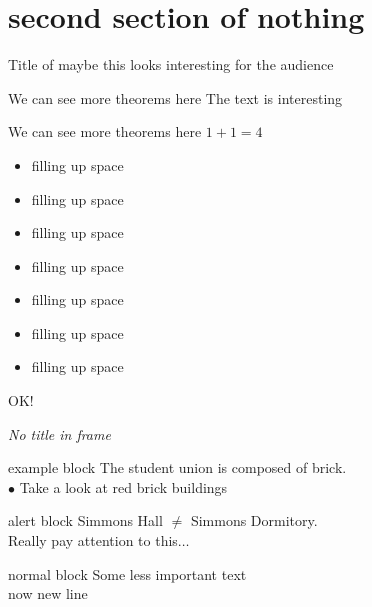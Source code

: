 \documentclass{beamer}
\begin{document}
\section{second section of nothing}
\begin{frame}{Title of maybe this looks interesting for the audience}

  \begin{block}{We can see more theorems here}
    The text is interesting
  \end{block}
  \begin{block}{We can see more theorems here}
    $1+1 = 4$
    \begin{itemize}
    \item filling up space
    \item filling up space
    \item filling up space
    \item filling up space
    \item filling up space
    \item filling up space
    \item filling up space
    \end{itemize}
    OK!
  \end{block}
  
\end{frame}



\begin{frame}{}

  \emph{{\large No title in frame}}
  
  \begin{exampleblock}{example block}
    The student union is composed of brick.\\
    $\bullet$ Take a look at red brick buildings
  \end{exampleblock}
  
  \begin{alertblock}{alert block}    
    Simmons Hall $\not=$ Simmons Dormitory.
    \\
    Really pay attention to this$\ldots$
  \end{alertblock}

  \begin{block}{normal block}
    Some less important text\\
    now new line
  \end{block}
  
  
\end{frame}
\end{document}
